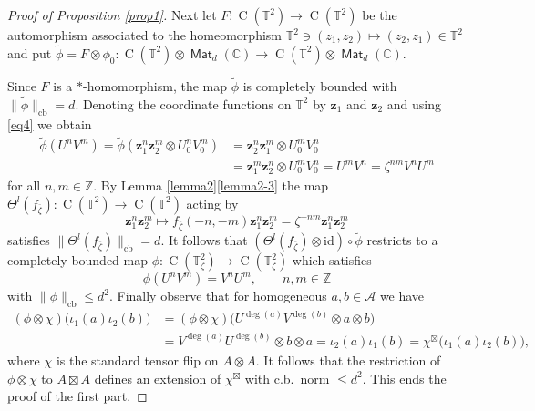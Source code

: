 \documentclass[12pt,reqno,a4paper]{amsart}
\theoremstyle{definition}
\newcommand{\id}{\mathrm{id}}
\newcommand{\tens}{\otimes}
\newcommand{\CC}{\mathbb{C}}
\newcommand{\TT}{\mathbb{T}}
\newcommand{\ZZ}{\mathbb{Z}}
\newcommand{\cA}{\mathscr{A}}
\newcommand{\bz}{{\boldsymbol{z}}}
\DeclareMathOperator{\C}{C}
\DeclareMathOperator{\Mat}{\mathsf{Mat}}
\DeclareMathOperator{\cb}{cb}
\numberwithin{equation}{section}
\begin{document}
\begin{appendices}
\begin{proof}[Proof of Proposition \ref{prop1}]
Next let $F\colon\C(\TT^2)\to\C(\TT^2)$ be the automorphism associated to the homeomorphism $\TT^2\ni(z_1,z_2)\mapsto(z_2,z_1)\in\TT^2$ and put $\widetilde{\phi}=F\tens\phi_0\colon\C(\TT^2)\tens\Mat_d(\CC)\to\C(\TT^2)\tens\Mat_d(\CC)$.

Since $F$ is a $*$-homomorphism, the map $\widetilde{\phi}$ is completely bounded with $\|\widetilde{\phi}\|_{\cb}=d$. Denoting the coordinate functions on $\TT^2$ by $\bz_1$ and $\bz_2$ and using \eqref{eq4} we obtain
\begin{align*}
\widetilde{\phi}(U^nV^m)
=\widetilde{\phi}(\bz_1^n\bz_2^m\tens U_0^nV_0^m)
&=\bz_2^n\bz_1^m\tens U_0^mV_0^n\\
&=\bz_1^m\bz_2^n\tens U_0^mV_0^n
=U^mV^n=\zeta^{nm}V^nU^m
\end{align*}
for all $n,m\in\ZZ$. By Lemma \ref{lemma2}\eqref{lemma2-3} the map $\Theta^l(f_{\overline{\zeta}})\colon\C(\TT^2)\to\C(\TT^2)$ acting by
\[
\bz_1^n\bz_2^m\longmapsto
f_{\overline{\zeta}}(-n,-m)\bz_1^n\bz_2^m=\zeta^{-nm}\bz_1^n\bz_2^m
\]
satisfies $\|\Theta^l(f_{\overline{\zeta}})\|_{\cb} =d$. It follows that $(\Theta^l(f_{\overline{\zeta}})\tens\id)\circ\widetilde\phi$ restricts to a completely bounded map $\phi\colon\C(\TT^2_{\zeta})\to\C(\TT^2_{\zeta})$ which satisfies
\[
\phi(U^nV^m)=V^nU^m,\qquad n,m\in\ZZ
\]
with $\|\phi\|_{\cb}\le d^2$. Finally observe that for homogeneous $a,b\in\cA$ we have
\begin{align*}
(\phi\tens\chi)\bigl(\iota_1(a)\iota_2(b)\bigr)
&=(\phi\tens\chi)\bigl(U^{\deg(a)}V^{\deg(b)}\tens a\tens b\bigr)\\
&=V^{\deg(a)}U^{\deg(b)}\tens b\tens a
=\iota_2(a)\iota_1(b)=\chi^{\boxtimes}\bigl(\iota_1(a)\iota_2(b)\bigr),
\end{align*}
where $\chi$ is the standard tensor flip on $A\tens A$. It follows that the restriction of $\phi\tens\chi$ to $A\boxtimes A$ defines an extension of $\chi^\boxtimes$ with c.b.~norm $\le d^2$. This ends the proof of the first part.


\end{proof}
\end{appendices}
\end{document}

